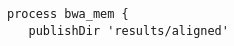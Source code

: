 \begin{lstlisting}
process bwa_mem {
   publishDir 'results/aligned'
\end{lstlisting}





%














